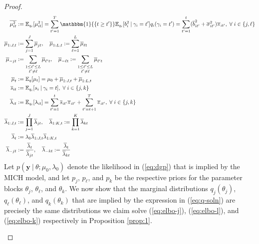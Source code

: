 \begin{proof}
\begin{align*}
    \overline{\mu^2_{it}} &:= \E_{q_i}[\mu^2_{it}] = \sum_{t'=1}^{T} \mathbbm{1}{\{t \geq t'\}}\E_{q_i}[b^2_i \:|\:\gamma_i = t']q_i(\gamma_i =t') = \sum_{t'=1}^t (\overline{b}^2_{i t'} + \overline{\sigma}^2_{i t'}) \overline{\pi}_{it'}, \sforall i \in \{j,\ell\}  \\
    \overline{\mu}_{1:J,t} &:= \sum_{j=1}^J \overline{\mu}_{jt}, \quad \overline{\mu}_{1:L,t} := \sum_{\ell=1}^L \overline{\mu}_{\ell t} \\
    \overline{\mu}_{-jt} &:= \sum_{\substack{1\leq\ell'\leq L \\ \ell' \neq \ell}} \overline{\mu}_{\ell' t}, \quad \overline{\mu}_{-\ell t} := \sum_{\substack{1\leq\ell'\leq L \\ \ell' \neq \ell}} \overline{\mu}_{\ell' t} \\
    \overline{\mu}_t &:= \E_q[\mu_t] = \mu_0 + \overline{\mu}_{1:J,t} + \overline{\mu}_{1:L,t} \\
    \overline{s}_{i t} &:= \E_{q_i}[s_i \:|\: \gamma_i = t], \sforall i \in \{j, k\} \\
    \overline{\lambda}_{it} &:= \E_{q_i}[\lambda_{it}] = \sum_{t'=1}^t \overline{s}_{i t'} \overline{\pi}_{i t'} + \sum_{t'=t+1}^T \overline{\pi}_{i t'}, \sforall i \in \{j, k\} \\
    \overline{\lambda}_{1:J, t} &:= \prod_{j=1}^J \overline{\lambda}_{j t}, \quad \overline{\lambda}_{1:K, t} := \prod_{k=1}^K \overline{\lambda}_{k t} \\
    \overline{\lambda}_t &:= \lambda_0 \overline{\lambda}_{1:J, t} \overline{\lambda}_{1:K, t} \\
    \overline{\lambda}_{-j t} &:= \frac{\overline{\lambda}_t }{\overline{\lambda}_{jt}}, \quad \overline{\lambda}_{-k t} := \frac{\overline{\lambda}_t }{\overline{\lambda}_{kt}}
\end{align*}
Let $p\left(\mathbf{y} \:|\: \theta;\mu_0,\lambda_0\right)$ denote the likelihood in (\ref{eq:dgp}) that is implied by the MICH model, and let $p_j$, $p_\ell$, and $p_k$ be the respective priors for the parameter blocks $\theta_j$, $\theta_\ell$, and $\theta_k$. We now show that the marginal distributions $q_j(\theta_j)$, $q_\ell(\theta_\ell)$, and $q_k(\theta_k)$ that are implied by the expression in (\ref{eq:q-soln}) are precisely the same distributions we claim solve (\ref{eq:elbo-j}), (\ref{eq:elbo-l}), and (\ref{eq:elbo-k}) respectively in Proposition \ref{prop:1}.

\begin{enumerate}[label=\roman*.]


\end{enumerate}
\end{proof}
